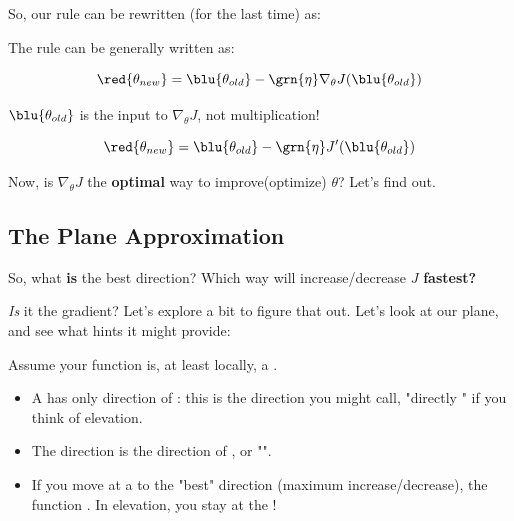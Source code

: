         So, our rule can be rewritten (for the last time) as:\\
        
        \begin{kequation}
            The  rule can be generally written as:
            
            \begin{equation*}
                \red{ \theta_{new} } =  \blu{ \theta_{old} } 
                - \grn{ \eta } 
                \nabla_\theta J ( \blu{ \theta_{old} } )
            \end{equation*}
            
            $\blu{ \theta_{old} }$ is the input to $\nabla_\theta J$, not multiplication!
            
            \begin{equation*}
                \red{ \theta_{new} } =  \blu{ \theta_{old} } 
                - \grn{ \eta } 
                J'( \blu{ \theta_{old} } )
            \end{equation*}
        \end{kequation}
        
        Now, is $\nabla_\theta J$ the \textbf{optimal} way to improve(optimize) $\theta$? Let's find out.
    
    \subsection{The Plane Approximation}
        
        So, what \textbf{is} the best direction? Which way will increase/decrease $J$ \textbf{fastest?} 
        
        \textit{Is} it the gradient? Let's explore a bit to figure that out. Let's look at our plane, and see what hints it might provide:
            \\
        
        \begin{concept}
            Assume your function is, at least locally, a .

            \begin{itemize}
                \item A  has only  direction of : this is the direction you might call, "directly " if you think of elevation.
                
                \item The  direction is the direction of , or "".
                
                \item If you move at a  to the "best" direction (maximum increase/decrease), the function . In elevation, you stay at the !
            \end{itemize}
        \end{concept}
        
